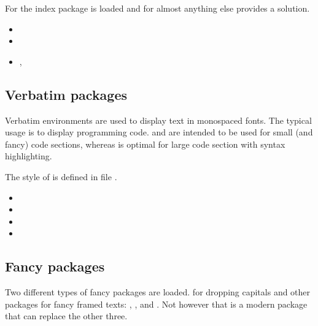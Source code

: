 For the index package  is loaded and for almost anything else  provides a solution.

\begin{itemize}[noitemsep]
\item {}
\item {}
\item {}, 
\end{itemize}


\subsection{Verbatim packages}
\label{sec:packages:verbatim}

Verbatim environments are used to display text in monospaced fonts. The typical usage is to display programming code.  and  are intended to be used for small (and fancy) code sections, whereas  is optimal for large code section with syntax highlighting.

The style of  is defined in file 
.

\begin{itemize}[noitemsep]
\item {}
\item {}
\item {}
\item {}
\end{itemize}


\subsection{Fancy packages}
\label{sec:packages:fancy}

Two different types of fancy packages are loaded.  for dropping capitals and other packages for fancy framed texts: , ,  and . Not however that  is a modern package that can replace the other three.

